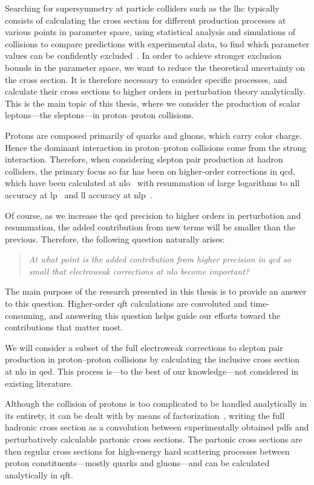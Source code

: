 Searching for supersymmetry at particle colliders such as the \gls{lhc} typically consists of calculating the cross section for different production processes at various points in parameter space, using statistical analysis and simulations of collisions to compare predictions with experimental data, to find which parameter values can be confidently excluded~\cite{ATLAS:2024lda}.
In order to achieve stronger exclusion bounds in the parameter space, we want to reduce the theoretical uncertainty on the cross section.
It is therefore necessary to consider specific processes, and calculate their cross sections to higher orders in perturbation theory analytically.
This is the main topic of this thesis, where we consider the production of scalar leptons---the sleptons---in proton--proton collisions.

Protons are composed primarily of quarks and gluons, which carry color charge. Hence the dominant interaction in proton--proton collisions come from the strong interaction.
Therefore, when considering slepton pair production at hadron colliders, the primary focus so far has been on higher-order corrections in \gls{qcd}, which have been calculated at \gls{nlo}~\cite{Baer:1997nh} with resummation of large logarithms to \gls{nll} accuracy at \gls{lp}~\cite{Bozzi:2006fw,Bozzi:2007qr,Bozzi:2007tea,Fiaschi:2018xdm} and \gls{ll} accuracy at \gls{nlp}~\cite{Braseth:2025ylj}.

Of course, as we increase the \gls{qcd} precision to higher orders in perturbation and resummation, the added contribution from new terms will be smaller than the previous.
Therefore, the following question naturally arises:
\begin{quote}
    \textit{At what point is the added contribution from higher precision in \gls{qcd} so small that electroweak corrections at \gls{nlo} become important?}
\end{quote}
The main purpose of the research presented in this thesis is to provide an answer to this question.
Higher-order \gls{qft} calculations are convoluted and time-consuming, and answering this question helps guide our efforts toward the contributions that matter most.

We will consider a subset of the full electroweak corrections to slepton pair production in proton--proton collisions by calculating the inclusive cross section at \gls{nlo} in \gls{qed}. This process is---to the best of our knowledge---not considered in existing literature.

Although the collision of protons is too complicated to be handled analytically in its entirety, it can be dealt with by means of factorization~\cite{Ellis:1996mzs}, writing the full hadronic cross section as a convolution between experimentally obtained \glspl{pdf} and perturbatively calculable partonic cross sections.
The partonic cross sections are then regular cross sections for high-energy hard scattering processes between proton constituents---mostly quarks and gluons---and can be calculated analytically in \gls{qft}.


